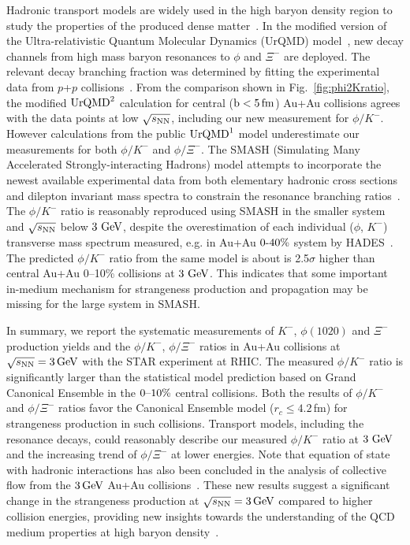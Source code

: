 \documentclass[%
 reprint,	
showpacs,
 amsmath,amssymb,
 aps,
 superscriptaddress,
]{revtex4-1}
\begin{document}
Hadronic transport models are widely used in the high baryon density region to study the properties of the produced dense matter~\cite{urQMD,UrQMD_2,Steinheimer_2015_UrQMD,Elfner_SMASH,Hartnack:2011cn,Song:2020clw}. In the modified version of the Ultra-relativistic Quantum Molecular Dynamics (UrQMD) model~\cite{Steinheimer_2015_UrQMD}, new decay channels from high mass baryon resonances to $\phi$ and $\Xi^-$ are deployed. The relevant decay branching fraction was determined by fitting the experimental data from $p$+$p$ collisions~\cite{ANKE_phi}. From the comparison shown in Fig.~\ref{fig:phi2Kratio}, the modified $\textup{UrQMD}^{2}$ calculation for central ($\rm{b}<5\,\rm{fm}$) Au+Au collisions agrees with the data points at low ${\sqrt{s_{\rm NN}}}$, including our new measurement for $\phi/K^-$.
However calculations from the public $\textup{UrQMD}^{1}$ model underestimate our measurements for both $\phi/K^-$ and $\phi/\Xi^-$.   
The SMASH
(Simulating Many Accelerated Strongly-interacting Hadrons) model attempts to incorporate the newest available experimental data from both elementary hadronic cross sections and dilepton invariant mass spectra to constrain the resonance branching ratios~\cite{Elfner_SMASH}. The $\phi/K^-$ ratio is reasonably reproduced using SMASH in the smaller system and ${\sqrt{s_{\rm NN}}}$ below $\textup{3 GeV}$, despite the overestimation of each individual ($\phi$, $K^-$) transverse mass spectrum measured, e.g. in Au+Au $\textup{0-40\%}$ system by HADES~\cite{Elfner_SMASH,HADES_phi_AuAu}. The predicted $\phi/K^-$ ratio from the same model is about is 2.5$\sigma$ higher than central Au+Au 0--10\% collisions at $\textup{3 GeV}$. This indicates that some important in-medium mechanism for strangeness production and propagation may be missing for the large system in SMASH.


In summary, we report the systematic measurements of $K^-$, $\phi(1020)$ and $\Xi^{-}$ production yields and the $\phi/K^-$, $\phi/\Xi^-$ ratios in Au+Au collisions at ${\sqrt{s_{\rm NN}} = \rm{3\,GeV}}$ with the STAR experiment at RHIC. The measured $\phi/K^-$ ratio is significantly larger than the statistical model prediction based on Grand Canonical Ensemble in the $\textup{0--10\%}$ central collisions. Both the results of $\phi/K^-$ and $\phi/\Xi^-$ ratios favor the Canonical Ensemble model ($r_c \leq 4.2$\,fm) for strangeness production in such collisions. Transport models, including the resonance decays, could reasonably describe our measured $\phi/K^-$ ratio at $\textup{3 GeV}$ and the increasing trend of $\phi/\Xi^-$ at lower energies. Note that equation of state with hadronic interactions has also been concluded in the analysis of collective flow from the $\rm{3\,GeV}$ Au+Au collisions~\cite{STAR:2021yiu}. These new results suggest a significant change in the strangeness production at ${\sqrt{s_{\rm NN}} = \rm{3\,GeV}}$ compared to higher collision energies, providing new insights towards the understanding of the QCD medium properties at high baryon density~\cite{KO_sQM17}. 
\end{document}
